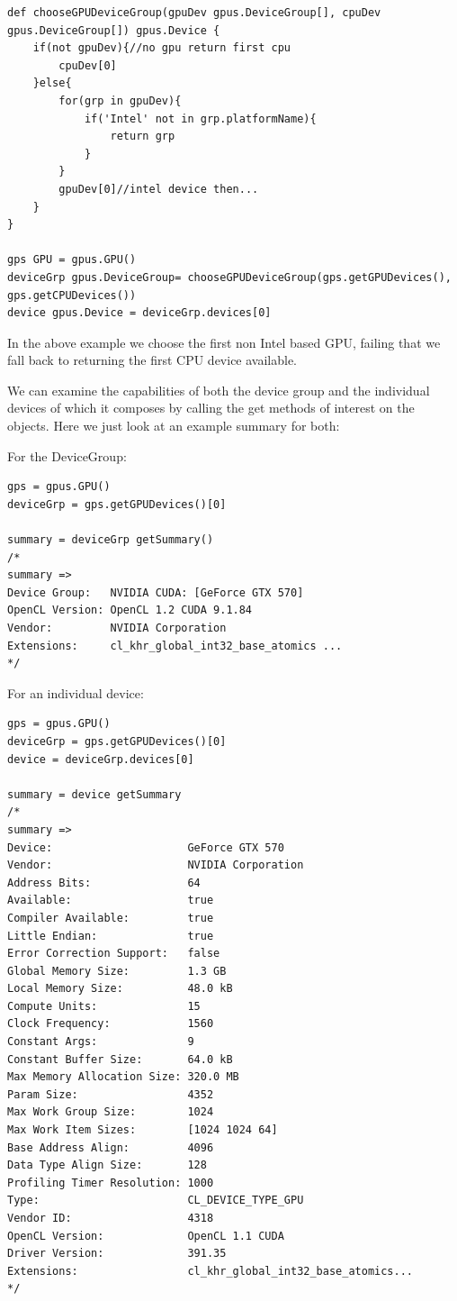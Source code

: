 \documentclass[conc-doc]{subfiles}
\begin{document}
\begin{lstlisting}
def chooseGPUDeviceGroup(gpuDev gpus.DeviceGroup[], cpuDev gpus.DeviceGroup[]) gpus.Device {
	if(not gpuDev){//no gpu return first cpu
		cpuDev[0]
	}else{
		for(grp in gpuDev){
			if('Intel' not in grp.platformName){
				return grp
			}
		}
		gpuDev[0]//intel device then...
	}
}

gps GPU = gpus.GPU()
deviceGrp gpus.DeviceGroup= chooseGPUDeviceGroup(gps.getGPUDevices(), gps.getCPUDevices())
device gpus.Device = deviceGrp.devices[0]
\end{lstlisting}

In the above example we choose the first non Intel based GPU, failing that we fall back to returning the first CPU device available.

We can examine the capabilities of both the device group and the individual devices of which it composes by calling the get methods of interest on the objects. Here we just look at an example summary for both:

For the DeviceGroup:
\begin{lstlisting}
gps = gpus.GPU()
deviceGrp = gps.getGPUDevices()[0]

summary = deviceGrp getSummary()
/*
summary => 
Device Group:   NVIDIA CUDA: [GeForce GTX 570]
OpenCL Version: OpenCL 1.2 CUDA 9.1.84
Vendor:         NVIDIA Corporation
Extensions:     cl_khr_global_int32_base_atomics ...
*/
\end{lstlisting}

For an individual device:
\begin{lstlisting}
gps = gpus.GPU()
deviceGrp = gps.getGPUDevices()[0]
device = deviceGrp.devices[0]

summary = device getSummary
/*
summary => 
Device:                     GeForce GTX 570
Vendor:                     NVIDIA Corporation
Address Bits:               64
Available:                  true
Compiler Available:         true
Little Endian:              true
Error Correction Support:   false
Global Memory Size:         1.3 GB
Local Memory Size:          48.0 kB
Compute Units:              15
Clock Frequency:            1560
Constant Args:              9
Constant Buffer Size:       64.0 kB
Max Memory Allocation Size: 320.0 MB
Param Size:                 4352
Max Work Group Size:        1024
Max Work Item Sizes:        [1024 1024 64]
Base Address Align:         4096
Data Type Align Size:       128
Profiling Timer Resolution: 1000
Type:                       CL_DEVICE_TYPE_GPU
Vendor ID:                  4318
OpenCL Version:             OpenCL 1.1 CUDA
Driver Version:             391.35
Extensions:                 cl_khr_global_int32_base_atomics...
*/
\end{lstlisting}
\end{document}

